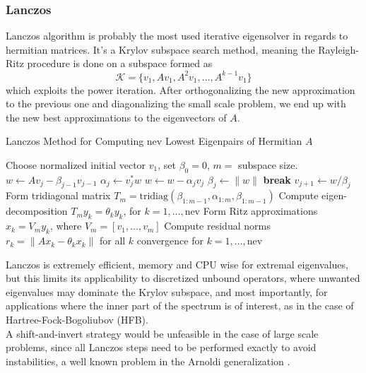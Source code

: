\subsubsection{Lanczos}
Lanczos algorithm \cite{lanczos1952solution} is probably the most used iterative eigensolver in regards to hermitian matrices. It's a Krylov subspace search method, meaning the Rayleigh-Ritz procedure is done on a subspace formed as 
\begin{equation}
    \mathcal K = \{ v_1, Av_1, A^2 v_1, \ldots, A^{k-1} v_1 \}
\end{equation}
which exploits the power iteration. After orthogonalizing the new approximation to the previous one and diagonalizing the small scale problem, we end up with the new best approximations to the eigenvectors of $A$.
\begin{algorithm}[H]
\caption{Lanczos Method for Computing nev Lowest Eigenpairs of Hermitian $A$}
\begin{algorithmic}[1]
\STATE Choose normalized initial vector $v_1$, set $\beta_0 = 0$, $m=$ subspace size.
\REPEAT
{}
    \STATE $w \gets A v_j - \beta_{j-1} v_{j-1}$
    \STATE $\alpha_j \gets v_j^* w$
    \STATE $w \gets w - \alpha_j v_j$
    \STATE $\beta_j \gets \|w\|$
        \STATE \textbf{break}
    \ENDIF
    \STATE $v_{j+1} \gets w / \beta_j$
\ENDFOR
\STATE Form tridiagonal matrix 
       $T_m = \mathrm{tridiag}(\beta_{1:m-1}, \alpha_{1:m}, \beta_{1:m-1})$
\STATE Compute eigen-decomposition $T_m y_k = \theta_k y_k$, 
       for $k = 1, \dots, \text{nev}$
\STATE Form Ritz approximations 
       $x_k = V_m y_k$, where $V_m = [v_1, \dots, v_m]$
\STATE Compute residual norms 
       $r_k = \|A x_k - \theta_k x_k\|$ for all $k$
\UNTIL convergence for $k = 1, \dots, \text{nev}$
\end{algorithmic}
\end{algorithm}
Lanczos is extremely efficient, memory and CPU wise for extremal eigenvalues, but this limits its applicability to discretized unbound operators, where unwanted eigenvalues may dominate the Krylov subspace, and most importantly, for applications where the inner part of the spectrum is of interest, as in the case of Hartree-Fock-Bogoliubov (HFB).
\\A shift-and-invert strategy would be unfeasible in the case of large scale problems, since all Lanczos steps need to be performed exactly to avoid instabilities, a well known problem in the Arnoldi generalization \cite{Saad1992}.
